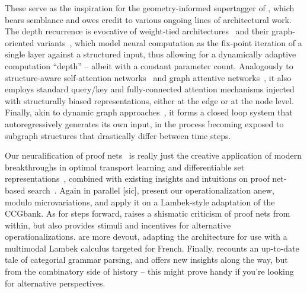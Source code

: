 These serve as the inspiration for the geometry-informed supertagger of \citet{kogkalidis2022geometryaware}, which bears semblance and owes credit to various ongoing lines of architectural work.
The depth recurrence is evocative of weight-tied architectures~\cite{dehghani2018universal,bai2019deep} and their graph-oriented variants~\cite{li2016gated}, which model neural computation as the fix-point iteration of a single layer against a structured input, thus allowing for a dynamically adaptive computation ``depth'' -- albeit with a constant parameter count.
Analogously to structure-aware self-attention networks~\cite[inter alia]{zhu-etal-2019-modeling,cai2020graph} and graph attentive networks~\cite[inter alia]{velivckovic2018graph,yun2019graph,ying2021transformers,brody2021attentive}, it also employs standard query/key and fully-connected attention mechanisms injected with structurally biased representations, either at the edge or at the node level.
Finally, akin to dynamic graph approaches~\cite{liao2019efficient,pareja2020evolvegcn}, it forms a closed loop system that autoregressively generates its own input, in the process becoming exposed to subgraph structures that drastically differ between time steps.

Our neuralification of proof nets~\cite{kogkalidis-etal-2020-neural} is really just the creative application of modern breakthroughs in optimal transport learning and differentiable set representations~\cite[inter alia]{cuturi2013sinkhorn,mena2018learning,grover2018stochastic,peyre2019computational}, combined with existing insights and intuitions on proof net-based search~\cite{moot2008graph}.
Again in parallel [sic], \citet{bhargava2021proof} present our operationalization anew, modulo microvariations, and apply it on a Lambek-style adaptation of the CCGbank.
As for steps forward, \citet{moot2022perspectives} raises a shismatic criticism of proof nets from within, but also provides stimuli and incentives for alternative operationalizations.
 are more devout, adapting the architecture for use with a multimodal Lambek calculus targeted for French. 
Finally, \citet{DBLP:journals/corr/abs-2109-10044} recounts an up-to-date tale of categorial grammar parsing, and offers new insights along the way, but from the combinatory side of history -- this might prove handy if you're looking for alternative perspectives.




